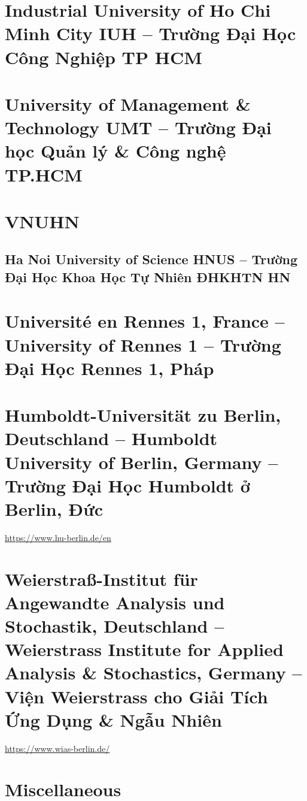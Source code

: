 \documentclass{article}
\begin{document}

\section{Industrial University of Ho Chi Minh City IUH -- Trường Đại Học Công Nghiệp TP HCM}


\section{University of Management \& Technology UMT -- Trường Đại học Quản lý \& Công nghệ TP.HCM}


\section{VNUHN}

\subsection{Ha Noi University of Science HNUS -- Trường Đại Học Khoa Học Tự Nhiên ĐHKHTN HN}


\section{Universit\'e en Rennes 1, France -- University of Rennes 1 -- Trường Đại Học Rennes 1, Pháp}


\section{Humboldt-Universität zu Berlin, Deutschland -- Humboldt University of Berlin, Germany -- Trường Đại Học Humboldt ở Berlin, Đức}
\url{https://www.hu-berlin.de/en}


\section{Weierstraß-Institut für Angewandte Analysis und Stochastik, Deutschland -- Weierstrass Institute for Applied Analysis \& Stochastics, Germany -- Viện Weierstrass cho Giải Tích Ứng Dụng \& Ngẫu Nhiên}
\url{https://www.wias-berlin.de/}


\section{Miscellaneous}


\printbibliography[heading=bibintoc]
	
\end{document}
